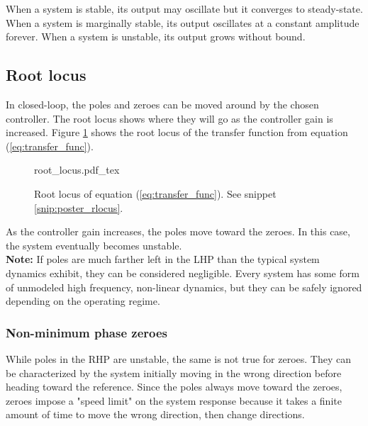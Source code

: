When a system is stable, its output may oscillate but it converges to
steady-state. When a system is marginally stable, its output oscillates at a
constant amplitude forever. When a system is unstable, its output grows without
bound.

\subsection{Root locus}

In closed-loop, the poles and zeroes can be moved around by the chosen
controller. The root locus shows where they will go as the controller gain is
increased. Figure \ref{fig:poster_rlocus} shows the root locus of the transfer
function from equation (\ref{eq:transfer_func}).

\begin{figure}[H]
  \def\svgwidth{\linewidth}
  {root_locus.pdf_tex}
  \caption{Root locus of equation (\ref{eq:transfer_func}). See snippet
    \ref{snip:poster_rlocus}.}
  \label{fig:poster_rlocus}
\end{figure}

\begin{snippet}
  \caption{Root locus in Python}
  \label{snip:poster_rlocus}
\end{snippet}

As the controller gain increases, the poles move toward the zeroes. In this
case, the \gls{system} eventually becomes unstable. \\

\textbf{Note:} If poles are much farther left in the LHP than the typical
\gls{system} dynamics exhibit, they can be considered negligible. Every
\gls{system} has some form of unmodeled high frequency, non-linear dynamics, but
they can be safely ignored depending on the operating regime.

\subsubsection{Non-minimum phase zeroes}

While poles in the RHP are unstable, the same is not true for zeroes. They can
be characterized by the \gls{system} initially moving in the wrong direction
before heading toward the \gls{reference}. Since the poles always move toward
the zeroes, zeroes impose a "speed limit" on the \gls{system} response because
it takes a finite amount of time to move the wrong direction, then change
directions. \\

